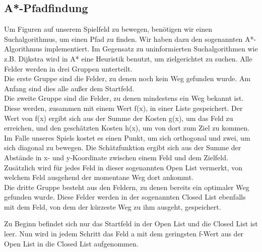 \documentclass[extern,palatino]{cgBA}
\begin{document}
\subsection{A*-Pfadfindung}\label{Pfadfindung}
Um Figuren auf unserem Spielfeld zu bewegen, benötigen wir einen Suchalgorithmus, um einen Pfad zu finden. Wir haben dazu den sogenannten A*-Algorithmus implementiert. Im Gegensatz zu uninformierten Suchalgorithmen wie z.B. Dijkstra wird in A* eine Heuristik benutzt, um zielgerichtet zu suchen. Alle Felder werden in drei Gruppen unterteilt. \\Die erste Gruppe sind die Felder, zu denen noch kein Weg gefunden wurde. Am Anfang sind dies alle außer dem Startfeld. \\Die zweite Gruppe sind die Felder, zu denen mindestens ein Weg bekannt ist. Diese werden, zusammen mit einem Wert f(x), in einer Liste gespeichert. Der Wert von f(x) ergibt sich aus der Summe der Kosten g(x), um das Feld zu erreichen, und den geschätzten Kosten h(x), um von dort zum Ziel zu kommen. Im Falle unseres Spiels kostet es einen Punkt, um sich orthogonal und zwei, um sich diagonal zu bewegen. Die Schätzfunktion ergibt sich aus der Summe der Abstände in x- und y-Koordinate zwischen einem Feld und dem Zielfeld. Zusätzlich wird für jedes Feld in dieser sogenannten Open List vermerkt, von welchem Feld ausgehend der momentane Weg dort ankommt. \\Die dritte Gruppe besteht aus den Feldern, zu denen bereits ein optimaler Weg gefunden wurde. Diese Felder werden in der sogenannten Closed List ebenfalls mit dem Feld, von dem der kürzeste Weg zu ihm ausgeht, gespeichert.

Zu Beginn befindet sich nur das Startfeld in der Open List und die Closed List ist leer. Nun wird in jedem Schritt das Feld a mit dem geringsten f-Wert aus der Open List in die Closed List aufgenommen. 
\end{document}
